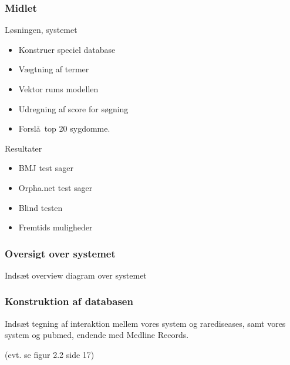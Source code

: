 \documentclass[xcolor=table]{beamer}
\begin{document}
\begin{frame}

  \frametitle{Midlet}

  \begin{block}{L\o sningen, systemet}

    \begin{itemize}

      \item Konstruer speciel database
      \item V\ae gtning af termer
      \item Vektor rums modellen
      \item Udregning af score for s\o gning
      \item Forsl\aa\ top 20 sygdomme.
    \end{itemize}

  \end{block}

  \begin{block}{Resultater}

    \begin{itemize}

      \item BMJ test sager
      \item Orpha.net test sager
      \item Blind testen
    \end{itemize}

  \end{block}

  \begin{itemize}
    \item Fremtids muligheder
  \end{itemize}

\end{frame}

\begin{frame}

  \frametitle{Oversigt over systemet}

  Inds\ae t overview diagram over systemet

\end{frame}

\begin{frame}

  \frametitle{Konstruktion af databasen}

  Inds\ae t tegning af interaktion mellem vores system og rarediseases, samt vores system og pubmed, endende med Medline Records.

  (evt. se figur 2.2 side 17)

\end{frame}
\end{document}
